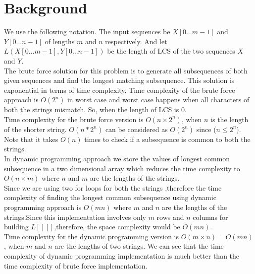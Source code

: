 \documentclass{article}
\begin{document}
\section{\textbf{Background}}
\indent \indent We use the following notation. The input sequences be $X[0 \ldots m-1]$ and $Y[0 \ldots n-1]$ of lengths $m$ and $n$ respectively. And let $L(X[0 \ldots m-1], Y[0 \ldots n-1])$ be the length of LCS of the two sequences $X$ and $Y$. \\
\indent The brute force solution for this problem is to generate all subsequences of both given sequences and find the longest matching subsequence. This solution is exponential in terms of time complexity. Time complexity of the brute force approach is $O(2^n)$ in worst case and worst case happens when all characters of both the strings mismatch. So, when the length of LCS is 0. \\
\indent Time complexity for the brute force version is $O(n \times 2^n)$, when $n$ is the length of the shorter string. $O(n * 2^n)$ can be considered as $O(2^n)$ since ($n \le 2^n$). Note that it takes $O(n)$ times to check if a subsequence is common to both the strings. \\
\indent In dynamic programming approach we store the values of longest common subsequence in a two dimensional array which reduces the time complexity to $O(n \times m)$ where $n$ and $m$ are the lengths of the strings. \\
\indent Since we are using two for loops for both the strings ,therefore the time complexity of finding the longest common subsequence using dynamic programming approach is $O(mn)$ where $m$ and $n$ are the lengths of the strings.Since this implementation involves only $m$ rows and $n$ columns for building $L[][]$,therefore, the space complexity would be $O(mn)$. \\
\indent Time complexity for the dynamic programming version is $O(m \times n) = O(mn)$, when $m$ and $n$ are the lengths of two strings. We can see that the time complexity of dynamic programming implementation is much better than the time complexity of brute force implementation. 
\end{document}
